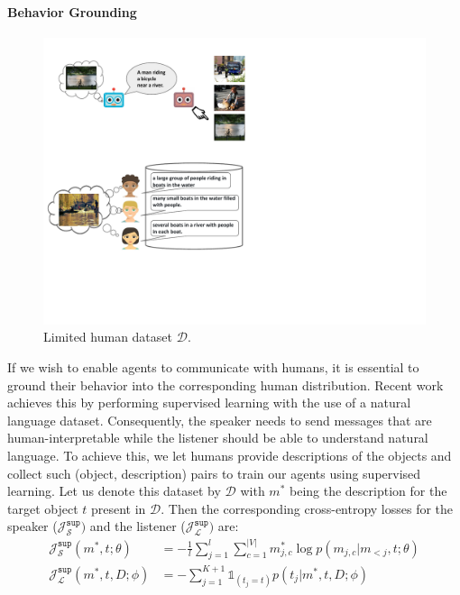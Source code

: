 \documentclass{article}
\begin{document}
\paragraph{Behavior Grounding}
\begin{figure}
\includegraphics[width=\linewidth]{figs/dataset.pdf}
\caption{Limited human dataset $\mathcal{D}$.}
\label{fig:dataset}
\end{figure}
If we wish to enable agents to communicate with humans, it is essential to ground their behavior into the corresponding human distribution. Recent work~\citep{lazaridou-etal-2020-multi,lowe*2020on,DBLP:journals/corr/abs-2003-12694} achieves this by performing supervised learning with the use of a natural language dataset. Consequently, the speaker needs to send messages that are human-interpretable while the listener should be able to understand natural language. To achieve this, we let humans provide descriptions of the objects and collect such (object, description) pairs to train our agents using supervised learning. Let us denote this dataset by $\mathcal{D}$ with $m^*$ being the description for the target object $t$ present in $\mathcal{D}$. Then the corresponding cross-entropy losses for the speaker ($\mathcal{J}^\texttt{sup}_\mathcal{S})$ and the listener ($\mathcal{J}^\texttt{sup}_\mathcal{L})$ are:
\begin{align}
\mathcal{J}_\mathcal{S}^\texttt{sup}(m^*,t;\theta) &= -\frac{1}{l}\sum_{j=1}^{l}\sum_{c=1}^{|V|} m^*_{j,c}\log p(m_{j,c} | m_{<j}, t; \theta) \label{eq:spk_sup} \\
\mathcal{J}_\mathcal{L}^\texttt{sup}(m^*, t, D; \phi) &= -\sum_{j=1}^{K+1}\mathds{1}_{(t_j=t)} p(t_j | m^*, t, D; \phi) \label{eq:lis_sup}
\end{align} 
\end{document}
